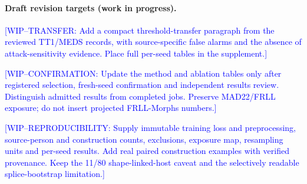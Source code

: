 \paragraph{Draft revision targets (work in progress).}
\textcolor{blue}{[WIP--TRANSFER: Add a compact threshold-transfer paragraph from the reviewed TT1/MEDS records, with source-specific false alarms and the absence of attack-sensitivity evidence. Place full per-seed tables in the supplement.]}

\textcolor{blue}{[WIP--CONFIRMATION: Update the method and ablation tables only after registered selection, fresh-seed confirmation and independent results review. Distinguish admitted results from completed jobs. Preserve MAD22/FRLL exposure; do not insert projected FRLL-Morphs numbers.]}

\textcolor{blue}{[WIP--REPRODUCIBILITY: Supply immutable training loss and preprocessing, source-person and construction counts, exclusions, exposure map, resampling units and per-seed results. Add real paired construction examples with verified provenance. Keep the 11/80 shape-linked-host caveat and the selectively readable splice-bootstrap limitation.]}

